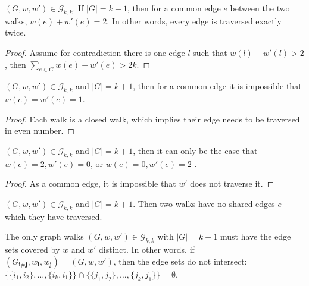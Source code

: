 \begin{lemma}
    \label{lem:traverse_exactly_twice}
    \notready
    $(G, w, w') \in \mathcal{G}_{k, k}$. If $|G| = k + 1$, then for a common edge $e$ between the two walks, $w(e) + w'(e) =2$. In other words, every edge is traversed exactly twice.
    \begin{proof}
        Assume for contradiction there is one edge $l$ such that $w(l) + w'(l) > 2$, then $\sum_{e \in G} w(e) + w'(e) > 2k$.
    \end{proof}
\end{lemma}


\begin{lemma}
    \label{lem:i_j_traverse_once}
    \notready
     $(G, w, w') \in \mathcal{G}_{k, k}$ and $|G| = k + 1$, then for a common edge it is impossible that $w(e) = w'(e) = 1$.
     \begin{proof}
       Each walk is a closed walk, which implies their edge needs to be traversed in even number.
     \end{proof}
\end{lemma}


\begin{lemma}
    \label{lem:one_walk_traverse_twice}
    \notready
     $(G, w, w') \in \mathcal{G}_{k, k}$ and $|G| = k + 1$, then it can only be the case that $w(e) = 2, w'(e) = 0$, or $w(e) = 0, w'(e) = 2$ .
     \begin{proof}
      As a common edge, it is impossible that $w'$ does not traverse it.
     \end{proof}
\end{lemma}



\begin{lemma}
    \label{lem:no_shared_edges}
    $(G, w, w') \in \mathcal{G}_{k, k}$ and $|G| = k + 1$. Then two walks have no shared edges $e$ which they have traversed.
\end{lemma}


\begin{lemma}
    \label{lem:disjoint_edge_set}
    \notready
    The only graph walks $(G,w,w')\in \mathcal{G}_{k,k}$ with $|G|=k+1$ must have the edge sets covered by $w$ and $w'$ distinct.  
    In other words, if $(G_{\mathbf{i}\#\mathbf{j}},w_\mathbf{i},w_\mathbf{j}) = (G,w,w')$, then the edge sets do not intersect: 
    $\{\{i_1,i_2\},\ldots,\{i_k,i_1\}\}\cap\{\{j_1,j_2\},\ldots,\{j_k,j_1\}\}=\emptyset$. 
\end{lemma}




